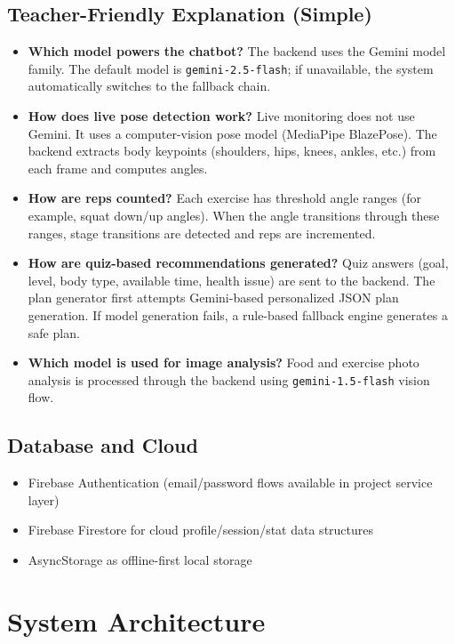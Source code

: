 \documentclass[12pt,a4paper]{article}
\begin{document}
\subsection{Teacher-Friendly Explanation (Simple)}
\begin{itemize}[leftmargin=1.2cm]
  \item \textbf{Which model powers the chatbot?} The backend uses the Gemini model family. The default model is \texttt{gemini-2.5-flash}; if unavailable, the system automatically switches to the fallback chain.
  \item \textbf{How does live pose detection work?} Live monitoring does not use Gemini. It uses a computer-vision pose model (MediaPipe BlazePose). The backend extracts body keypoints (shoulders, hips, knees, ankles, etc.) from each frame and computes angles.
  \item \textbf{How are reps counted?} Each exercise has threshold angle ranges (for example, squat down/up angles). When the angle transitions through these ranges, stage transitions are detected and reps are incremented.
  \item \textbf{How are quiz-based recommendations generated?} Quiz answers (goal, level, body type, available time, health issue) are sent to the backend. The plan generator first attempts Gemini-based personalized JSON plan generation. If model generation fails, a rule-based fallback engine generates a safe plan.
  \item \textbf{Which model is used for image analysis?} Food and exercise photo analysis is processed through the backend using \texttt{gemini-1.5-flash} vision flow.
\end{itemize}

\subsection{Database and Cloud}
\begin{itemize}[leftmargin=1.2cm]
  \item Firebase Authentication (email/password flows available in project service layer)
  \item Firebase Firestore for cloud profile/session/stat data structures
  \item AsyncStorage as offline-first local storage
\end{itemize}

\section{System Architecture}
\end{document}
